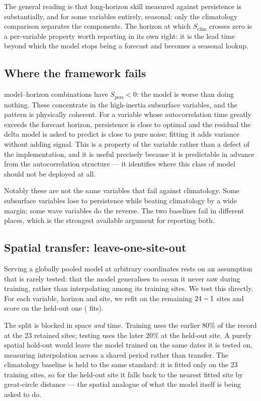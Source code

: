 The general reading is that long-horizon skill measured against persistence is
substantially, and for some variables entirely, seasonal; only the climatology
comparison separates the components. The horizon at which $S_{\mathrm{clim}}$
crosses zero is a per-variable property worth reporting in its own right: it is
the lead time beyond which the model stops being a forecast and becomes a
seasonal lookup.

\subsection{Where the framework fails}

\NLoseToPers{} model--horizon combinations have $S_{\mathrm{pers}} < 0$: the
model is worse than doing nothing. These concentrate in the high-inertia
subsurface variables, and the pattern is physically coherent. For a variable
whose autocorrelation time greatly exceeds the forecast horizon, persistence is
close to optimal and the residual the delta model is asked to predict is close
to pure noise; fitting it adds variance without adding signal. This is a
property of the variable rather than a defect of the implementation, and it is
useful precisely because it is predictable in advance from the autocorrelation
structure --- it identifies where this class of model should not be deployed at
all.

Notably these are not the same variables that fail against climatology. Some
subsurface variables lose to persistence while beating climatology by a wide
margin; some wave variables do the reverse. The two baselines fail in different
places, which is the strongest available argument for reporting both.

\subsection{Spatial transfer: leave-one-site-out}
\label{sec:loso}

Serving a globally pooled model at arbitrary coordinates rests on an assumption
that is rarely tested: that the model generalises to ocean it never saw during
training, rather than interpolating among its training sites. We test this
directly. For each variable, horizon and site, we refit on the remaining
\(24 - 1\) sites and score on the held-out one (\NLosoFits{} fits).

The split is blocked in space \emph{and} time. Training uses the earlier 80\%
of the record at the 23 retained sites; testing uses the later 20\% at the
held-out site. A purely spatial hold-out would leave the model trained on the
same dates it is tested on, measuring interpolation across a shared period
rather than transfer. The climatology baseline is held to the same standard: it
is fitted only on the 23 training sites, so for the held-out site it falls back
to the nearest fitted site by great-circle distance --- the spatial analogue of
what the model itself is being asked to do.

